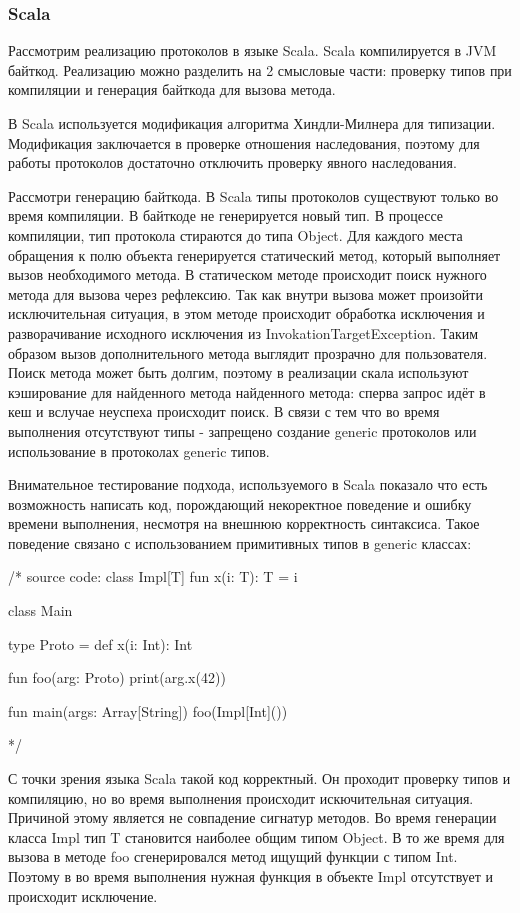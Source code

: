 \subsubsection{Scala}
Рассмотрим реализацию протоколов в языке Scala. Scala компилируется в JVM байткод. Реализацию можно разделить на 2 смысловые части: проверку типов при компиляции и генерация байткода для вызова метода.

В Scala используется модификация алгоритма Хиндли-Милнера для типизации. Модификация заключается в проверке отношения наследования, поэтому для работы протоколов достаточно отключить проверку явного наследования.

Рассмотри генерацию байткода. В Scala типы протоколов существуют только во время компиляции. В байткоде не генерируется новый тип. В процессе компиляции, тип протокола стираются до типа Object. Для каждого места обращения к полю объекта генерируется статический метод, который выполняет вызов необходимого метода. В статическом методе происходит поиск нужного метода для вызова через рефлексию. Так как внутри вызова может произойти исключительная ситуация, в этом методе происходит обработка исключения и разворачивание исходного исключения из InvokationTargetException. Таким образом вызов дополнительного метода выглядит прозрачно для пользователя. Поиск метода может быть долгим, поэтому в реализации скала используют кэширование для найденного метода найденного метода: сперва запрос идёт в кеш и вслучае неуспеха происходит поиск. В связи с тем что во время выполнения отсутствуют типы - запрещено создание generic протоколов или использование в протоколах generic типов.

Внимательное тестирование подхода, используемого в Scala показало что есть возможность написать код, порождающий некоректное поведение и ошибку времени выполнения, несмотря на внешнюю корректность синтаксиса. Такое поведение связано с использованием примитивных типов в generic классах:

/*
source code:
class Impl[T] {
	fun x(i: T): T = i
}

class Main {
	type Proto = { def x(i: Int): Int }

	fun foo(arg: Proto) {
		print(arg.x(42))
	}

	fun main(args: Array[String]) {
		foo(Impl[Int]())
	}
}
*/

С точки зрения языка Scala такой код корректный. Он проходит проверку типов и компиляцию, но во время выполнения происходит искючительная ситуация. Причиной этому является не совпадение сигнатур методов. Во время генерации класса Impl тип T становится наиболее общим типом Object. В то же время для вызова в методе foo сгенерировался метод ищущий функции с типом Int. Поэтому в во время выполнения нужная функция в объекте Impl отсутствует и происходит исключение.

